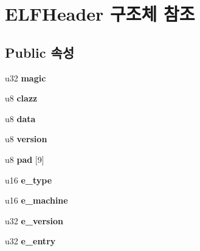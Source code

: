 \hypertarget{struct_e_l_f_header}{}\section{E\+L\+F\+Header 구조체 참조}
\label{struct_e_l_f_header}
\subsection*{Public 속성}
\begin{DoxyCompactItemize}
\item 
\mbox{\label{struct_e_l_f_header_a5b65dfa66d5f45063e099e1bd8f7d39a}} 
u32 {\bfseries magic}
\item 
\mbox{\label{struct_e_l_f_header_a0fc22a0f7de5c991bf26ed09f4090b0a}} 
u8 {\bfseries clazz}
\item 
\mbox{\label{struct_e_l_f_header_a0ebb6f21956e220cfc13e3d709fb29e7}} 
u8 {\bfseries data}
\item 
\mbox{\label{struct_e_l_f_header_aadac9bc05322252d95cff920e133ca15}} 
u8 {\bfseries version}
\item 
\mbox{\label{struct_e_l_f_header_a031107283881d74df8f63a4bccd7cce1}} 
u8 {\bfseries pad} \mbox{[}9\mbox{]}
\item 
\mbox{\label{struct_e_l_f_header_afe37d30bff98bf36cb852b938fbc7c40}} 
u16 {\bfseries e\+\_\+type}
\item 
\mbox{\label{struct_e_l_f_header_a15a148d4a49f9e5993698c2096e8c9bd}} 
u16 {\bfseries e\+\_\+machine}
\item 
\mbox{\label{struct_e_l_f_header_a60e61e8eaa05924bef446c706d47b492}} 
u32 {\bfseries e\+\_\+version}
\item 
\mbox{\label{struct_e_l_f_header_a1970539a110b9474ca7e802385e63eff}} 
u32 {\bfseries e\+\_\+entry}
\item 
\mbox{\label{struct_e_l_f_header_aca3de0226873cd41864a32e600bef156}} 

\end{DoxyCompactItemize}
